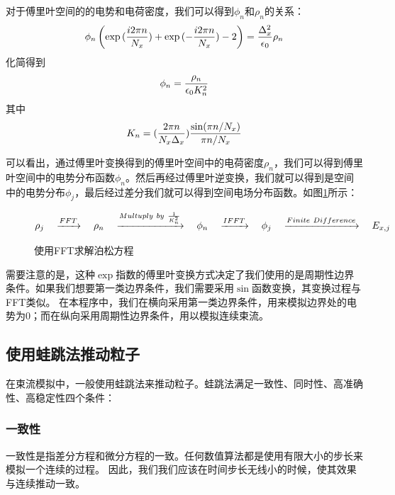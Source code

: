 {对于傅里叶空间的的电势和电荷密度，我们可以得到$\phi_{n}$和$\rho_{n}$的关系：
\begin{equation}\label{eq:FFT@PIC3}
\phi_{n}\left(\exp{(\frac{i2 \pi n}{N_x} )}  +  \exp{(-\frac{i2 \pi n}{N_x})} - 2 \right)
 = \frac{\Delta _{x}^{2}}{\epsilon _0} {\rho_n} \\
\end{equation}
化简得到
\begin{equation}\label{eq:FFT@PIC3}
\phi_{n} = \frac{\rho_n}{\epsilon _0 K_n^2} \\
\end{equation}
其中
\begin{equation}\label{eq:FFT@PIC4}
K_n = (\frac{2\pi n}{N_x \Delta _x}) \frac{\sin({\pi n}/{N_x})}{{\pi n}/{N_x}} \\
\end{equation}

可以看出，通过傅里叶变换得到的傅里叶空间中的电荷密度$\rho_{n}$，我们可以得到傅里叶空间中的电势分布函数$\phi_{n}$。然后再经过傅里叶逆变换，我们就可以得到是空间中的电势分布$\phi_{j}$，最后经过差分我们就可以得到空间电场分布函数。如图\ref{fig:PIC_FFT_Poisson}所示：
\begin{figure}[ht]
  \begin{equation*}
    \centering
    \rho_j \quad \xrightarrow{FFT} \quad \rho_n  \quad \xrightarrow{Multuply\ by\ \frac{1}{K_n^2}}   \quad  \phi_n  \quad \xrightarrow{IFFT} \quad  \phi_j \quad \xrightarrow{Finite\ Difference} \quad  E_{x,j}
  \end{equation*}
  \caption{使用FFT求解泊松方程}
  \label{fig:PIC_FFT_Poisson}
\end{figure}

需要注意的是，这种$\exp$指数的傅里叶变换方式决定了我们使用的是周期性边界条件。如果我们想要第一类边界条件，我们需要采用$\sin$函数变换，其变换过程与FFT类似。
在本程序中，我们在横向采用第一类边界条件，用来模拟边界处的电势为0；而在纵向采用周期性边界条件，用以模拟连续束流。

\subsection{使用蛙跳法推动粒子}
在束流模拟中，一般使用蛙跳法来推动粒子。蛙跳法满足一致性、同时性、高准确性、高稳定性四个条件：

\subsubsection{一致性}
      一致性是指差分方程和微分方程的一致。任何数值算法都是使用有限大小的步长来模拟一个连续的过程。
      因此，我们我们应该在时间步长无线小的时候，使其效果与连续推动一致。
      
}

